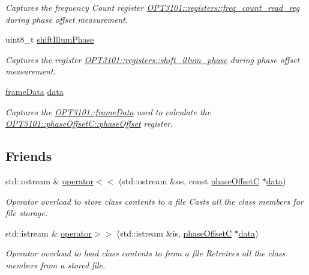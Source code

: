 \begin{DoxyCompactItemize}
\begin{DoxyCompactList}\small\item\em Captures the frequency Count register \mbox{\hyperlink{class_o_p_t3101_1_1registers_a0d343738560c0bc418f34b458735a811}{O\+P\+T3101\+::registers\+::freq\+\_\+count\+\_\+read\+\_\+reg}} during phase offset measurement. \end{DoxyCompactList}\item 
uint8\+\_\+t \mbox{\hyperlink{class_o_p_t3101_1_1phase_offset_c_a1977598d500c18fdd2ba58cbfd8789b9}{shift\+Illum\+Phase}}
\begin{DoxyCompactList}\small\item\em Captures the register \mbox{\hyperlink{class_o_p_t3101_1_1registers_a18539cc6fd63ce4f504fcf16b1e48f31}{O\+P\+T3101\+::registers\+::shift\+\_\+illum\+\_\+phase}} during phase offset measurement. \end{DoxyCompactList}\item 
\mbox{\hyperlink{class_o_p_t3101_1_1frame_data}{frame\+Data}} \mbox{\hyperlink{class_o_p_t3101_1_1phase_offset_c_a2db3531b8b3c643bae7af9db0e1fd040}{data}}
\begin{DoxyCompactList}\small\item\em Captures the \mbox{\hyperlink{class_o_p_t3101_1_1frame_data}{O\+P\+T3101\+::frame\+Data}} used to calculate the \mbox{\hyperlink{class_o_p_t3101_1_1phase_offset_c_addeef913546f1c431b4fd189478884f9}{O\+P\+T3101\+::phase\+Offset\+C\+::phase\+Offset}} register. \end{DoxyCompactList}\end{DoxyCompactItemize}
\subsection*{Friends}
\begin{DoxyCompactItemize}
\item 
std\+::ostream \& \mbox{\hyperlink{class_o_p_t3101_1_1phase_offset_c_a14c7935315901f4bd7c15982b88da40a}{operator$<$$<$}} (std\+::ostream \&os, const \mbox{\hyperlink{class_o_p_t3101_1_1phase_offset_c}{phase\+OffsetC}} $\ast$\mbox{\hyperlink{class_o_p_t3101_1_1phase_offset_c_a2db3531b8b3c643bae7af9db0e1fd040}{data}})
\begin{DoxyCompactList}\small\item\em Operator overload to store class contents to a file Casts all the class members for file storage. \end{DoxyCompactList}\item 
std\+::istream \& \mbox{\hyperlink{class_o_p_t3101_1_1phase_offset_c_afa58bc00875bb33c432f672980242427}{operator$>$$>$}} (std\+::istream \&is, \mbox{\hyperlink{class_o_p_t3101_1_1phase_offset_c}{phase\+OffsetC}} $\ast$\mbox{\hyperlink{class_o_p_t3101_1_1phase_offset_c_a2db3531b8b3c643bae7af9db0e1fd040}{data}})
\begin{DoxyCompactList}\small\item\em Operator overload to load class contents to from a file Retreives all the class members from a stored file. \end{DoxyCompactList}\end{DoxyCompactItemize}


